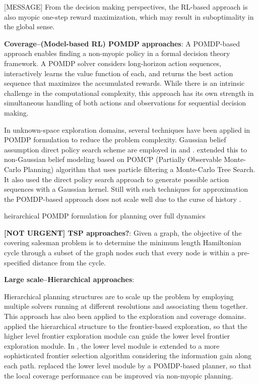 \documentclass{article}
\newcommand{\ph}[1]{{\textbf{#1}:}} %
\begin{document}
[MESSAGE] From the decision making perspectives, the RL-based approach is also myopic one-step reward maximization, which may result in suboptimality in the global sense.


\ph{Coverage--(Model-based RL) POMDP approaches}
%
A POMDP-based approach enables finding a non-myopic policy in a formal decision theory framework.
A POMDP solver considers long-horizon action sequences, interactively learns the value function of each, and returns the best action sequence that maximizes the accumulated rewards.
While there is an intrinsic challenge in the computational complexity, this approach has its own strength in simultaneous handling of both actions and observations for sequential decision making.

In unknown-space exploration domains, several techniques have been applied in POMDP formulation to reduce the problem complexity.
Gaussian belief assumption direct policy search scheme are employed in \cite{martinez2009bayesian} and \cite{indelman2015planning}.
\citet{Lauri2016planning} extended this to non-Gaussian belief modeling based on POMCP (Partially Observable Monte-Carlo Planning) \cite{silver2010monte} algorithm that uses particle filtering a Monte-Carlo Tree Search.
It also used the direct policy search approach to generate possible action sequences with a Gaussian kernel.
Still with such techniques for approximation the POMDP-based approach does not scale well due to the curse of history \cite{Pineau03}.


heirarchical POMDP formulation for planning over full dynamics \cite{pmlr-v87-jain18a}

\ph{[NOT URGENT] TSP approaches?}
Given a graph, the objective of the covering salesman problem is to determine the minimum length Hamiltonian cycle through a subset of the graph nodes such that every node is within a pre-specified distance from the cycle.  



\ph{Large scale--Hierarchical approaches}

Hierarchical planning structures are to scale up the problem by employing multiple solvers running at different resolutions and associating them together.
This approach has also been applied to the exploration and coverage domains.
%
\citet{umari2017autonomous} applied the hierarchical structure to the frontier-based exploration, so that the higher level frontier exploration module can guide the lower level frontier exploration module.
In \cite{dang2019explore}, the lower level module is extended to a more sophisticated frontier selection algorithm considering the information gain along each path.
\citet{Lauri2016planning} replaced the lower level module by a POMDP-based planner, so that the local coverage performance can be improved via non-myopic planning.
\end{document}
